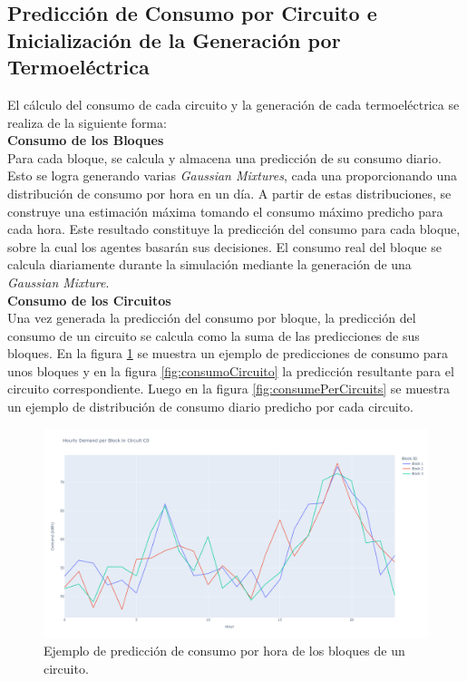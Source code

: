 \documentclass[twocolumn, fontsize=10pt]{article}
\begin{document}
\subsection{Predicción de Consumo por Circuito e Inicialización de la Generación por Termoeléctrica}

El cálculo del consumo de cada circuito y la generación de cada termoeléctrica se realiza de la siguiente forma:\\

\textbf{Consumo de los Bloques}\\
 Para cada bloque, se calcula y almacena una predicción 
  de su consumo diario. Esto se logra generando varias 
  \textit{Gaussian Mixtures}, cada una proporcionando una 
  distribución de consumo por hora en un día. A partir de 
  estas distribuciones, se construye una estimación máxima 
  tomando el consumo máximo predicho para cada hora. 
  Este resultado constituye la predicción del consumo para 
  cada bloque, sobre la cual los agentes basarán sus decisiones. 
  El consumo real del bloque se calcula diariamente durante 
  la simulación mediante la generación de una \textit{Gaussian Mixture}.\\

\textbf{Consumo de los Circuitos}\\
Una vez generada la predicción del consumo por bloque, la predicción del consumo
   de un circuito se calcula como la suma de las predicciones de sus bloques. En la figura \ref{fig:consumoBloques} 
   se muestra un ejemplo de predicciones de consumo para unos bloques y en la figura \ref{fig:consumoCircuito} la
   predicción resultante para el circuito correspondiente. Luego en la figura \ref{fig:consumePerCircuits} se muestra un ejemplo de distribución de consumo diario predicho por cada circuito.\\


\begin{figure}[H]
\centering
\includegraphics[width=\columnwidth]{assets/hourlydemandperblock.png}
\caption{Ejemplo de predicción de consumo por hora de los bloques de un circuito.}
\label{fig:consumoBloques}
\end{figure}
\end{document}
